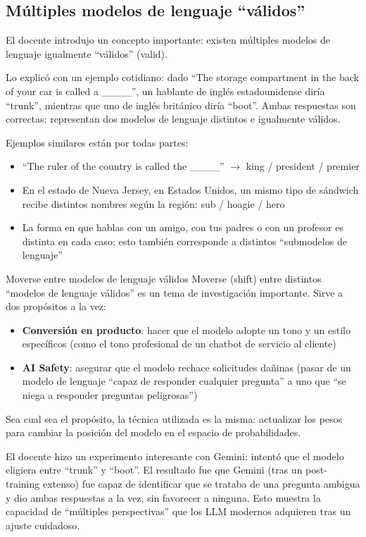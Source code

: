 \documentclass[a4paper]{article}
\begin{document}
\subsection{Múltiples modelos de lenguaje ``válidos''}

El docente introdujo un concepto importante: existen múltiples modelos de lenguaje igualmente ``válidos'' (valid).

Lo explicó con un ejemplo cotidiano: dado ``The storage compartment in the back of your car is called a \_\_\_\_'', un hablante de inglés estadounidense diría ``trunk'', mientras que uno de inglés británico diría ``boot''. Ambas respuestas son correctas: representan dos modelos de lenguaje distintos e igualmente válidos.

Ejemplos similares están por todas partes:
\begin{itemize}
    \item ``The ruler of the country is called the \_\_\_\_'' $\rightarrow$ king / president / premier
    \item En el estado de Nueva Jersey, en Estados Unidos, un mismo tipo de sándwich recibe distintos nombres según la región: sub / hoagie / hero
    \item La forma en que hablas con un amigo, con tus padres o con un profesor es distinta en cada caso; esto también corresponde a distintos ``submodelos de lenguaje''
\end{itemize}

\begin{knowledgebox}{Moverse entre modelos de lenguaje válidos}
Moverse (shift) entre distintos ``modelos de lenguaje válidos'' es un tema de investigación importante. Sirve a dos propósitos a la vez:
\begin{itemize}
    \item \textbf{Conversión en producto}: hacer que el modelo adopte un tono y un estilo específicos (como el tono profesional de un chatbot de servicio al cliente)
    \item \textbf{AI Safety}: asegurar que el modelo rechace solicitudes dañinas (pasar de un modelo de lenguaje ``capaz de responder cualquier pregunta'' a uno que ``se niega a responder preguntas peligrosas'')
\end{itemize}
Sea cual sea el propósito, la técnica utilizada es la misma: actualizar los pesos para cambiar la posición del modelo en el espacio de probabilidades.
\end{knowledgebox}

El docente hizo un experimento interesante con Gemini: intentó que el modelo eligiera entre ``trunk'' y ``boot''. El resultado fue que Gemini (tras un post-training extenso) fue capaz de identificar que se trataba de una pregunta ambigua y dio ambas respuestas a la vez, sin favorecer a ninguna. Esto muestra la capacidad de ``múltiples perspectivas'' que los LLM modernos adquieren tras un ajuste cuidadoso.
\end{document}
